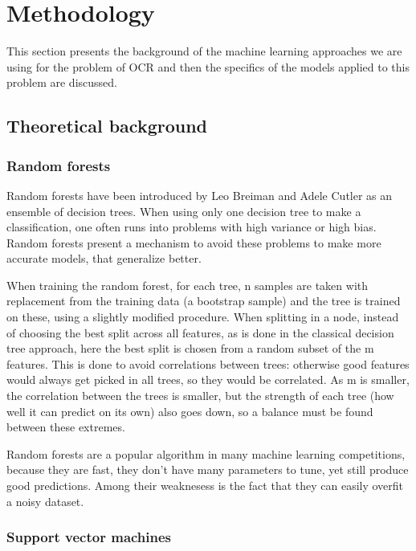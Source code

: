 \section{Methodology}
\label{sec:method}
This section presents the background of the machine learning approaches we are using for the problem of OCR and then the specifics of the models applied to this problem are discussed. 

\subsection{Theoretical background}

\subsubsection{Random forests}

Random forests have been introduced by Leo Breiman and Adele Cutler\cite{breiman2001random} as an ensemble of decision trees. When using only one decision tree to make a classification, one often runs into problems with high variance or high bias. Random forests present a mechanism to avoid these problems to make more accurate models, that generalize better. 

When training the random forest, for each tree, n samples are taken with replacement from the training data (a bootstrap sample) and the tree is trained on these, using a slightly modified procedure. When splitting in a node, instead of choosing the best split across all features, as is done in the classical decision tree approach, here the best split is chosen from a random subset of the m features. This is done to avoid correlations between trees: otherwise good features would always get picked in all trees, so they would be correlated. As m is smaller, the correlation between the trees is smaller, but the strength of each tree (how well it can predict on its own) also goes down, so a balance must be found between these extremes. 

Random forests are a popular algorithm in many machine learning competitions, because they are fast, they don't have many parameters to tune, yet still produce good predictions. Among their weaknesess is the fact that they can easily overfit a noisy dataset. 

\subsubsection{Support vector machines}

